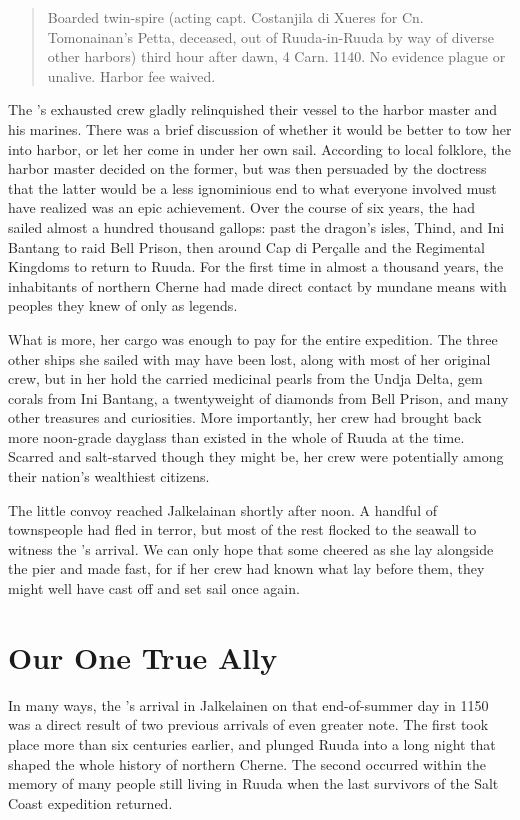 \documentclass[12pt]{report}
\begin{document}
\begin{quotation}
Boarded twin-spire {\UL} (acting capt. Costanjila di
Xueres for Cn. Tomonainan's Petta, deceased, out of Ruuda-in-Ruuda
by way of diverse other harbors) third hour after dawn, 4
Carn. 1140.  No evidence plague or unalive.  Harbor fee waived.
\end{quotation}

The {\UL}'s exhausted crew gladly relinquished their vessel to the
harbor master and his marines.  There was a brief discussion of
whether it would be better to tow her into harbor, or let her come in
under her own sail.  According to local folklore, the harbor master
decided on the former, but was then persuaded by the doctress that the
latter would be a less ignominious end to what everyone involved must
have realized was an epic achievement.  Over the course of six years,
the {\UL} had sailed almost a hundred thousand gallops: past the
dragon's isles, Thind, and Ini Bantang to raid Bell Prison, then
around Cap di Per\c{c}alle and the Regimental Kingdoms to return to
Ruuda.  For the first time in almost a thousand years, the inhabitants
of northern Cherne had made direct contact by mundane means with
peoples they knew of only as legends.

What is more, her cargo was enough to pay for the entire expedition.
The three other ships she sailed with may have been lost, along with
most of her original crew, but in her hold the {\UL} carried medicinal
pearls from the Undja Delta, gem corals from Ini Bantang, a
twentyweight of diamonds from Bell Prison, and many other treasures
and curiosities.  More importantly, her crew had brought back more
noon-grade dayglass than existed in the whole of Ruuda at the time.
Scarred and salt-starved though they might be, her crew were
potentially among their nation's wealthiest citizens.

The little convoy reached Jalkelainan shortly after noon.  A handful
of townspeople had fled in terror, but most of the rest flocked to the
seawall to witness the {\UL}'s arrival.  We can only hope that some
cheered as she lay alongside the pier and made fast, for if her crew
had known what lay before them, they might well have cast off and set
sail once again.

\chapter{Our One True Ally}

In many ways, the {\UL}'s arrival in Jalkelainen on that end-of-summer
day in 1150 was a direct result of two previous arrivals of even
greater note.  The first took place more than six centuries earlier,
and plunged Ruuda into a long night that shaped the whole history of
northern Cherne.  The second occurred within the memory of many people
still living in Ruuda when the last survivors of the Salt Coast
expedition returned.
\end{document}
